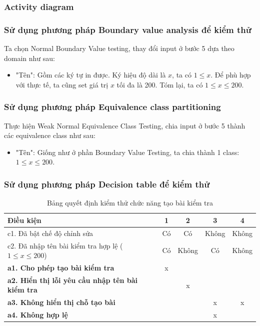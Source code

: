 \documentclass[a4paper, 12pt]{article}
\begin{document}
\subsubsection{Activity diagram}
\subsubsection{Sử dụng phương pháp Boundary value analysis để kiểm thử}
Ta chọn Normal Boundary Value testing, thay đổi input ở bước 5 dựa theo domain như sau:
\begin{itemize}
    \item "Tên": Gồm các ký tự in được. Ký hiệu độ dài là $x$, ta có $1 \leq x$. Để phù hợp với thực tế, ta cũng set giá trị $x$ tối đa là 200. Tóm lại, ta có $1 \leq x \leq 200$.
\end{itemize}

\subsubsection{Sử dụng phương pháp Equivalence class partitioning}
Thực hiện Weak Normal Equivalence Class Testing, chia input ở bước 5 thành các equivalence class như sau:
\begin{itemize}
    \item "Tên": Giống như ở phần Boundary Value Testing, ta chia thành 1 class: $1 \leq x \leq 200$.
\end{itemize}
\subsubsection{Sử dụng phương pháp Decision table để kiểm thử}

\begin{table}[H]
    \centering
    \begin{tabular}{|p{5cm}|c|c|c|c|}
        \hline
        \textbf{Điều kiện} & \textbf{1} & \textbf{2} & \textbf{3} & \textbf{4} \\
        \hline
        c1. Đã bật chế độ chỉnh sửa & Có & Có & Không & Không \\
        \hline
        c2. Đã nhập tên bài kiểm tra hợp lệ ($1 \leq x \leq 200$) & Có & Không & Có & Không \\
        \hline
        \hline
        \textbf{a1. Cho phép tạo bài kiểm tra} & x & & & \\
        \hline
        \textbf{a2. Hiển thị lỗi yêu cầu nhập tên bài kiểm tra} & & x & & \\
        \hline
        \textbf{a3. Không hiển thị chỗ tạo bài} & & & x & x \\
        \hline
        \textbf{a4. Không hợp lệ} & & &x & \\\hline
    \end{tabular}
    \caption{Bảng quyết định kiểm thử chức năng tạo bài kiểm tra}
    \label{tab:decision-table-create-quiz}
\end{table}
\end{document}
